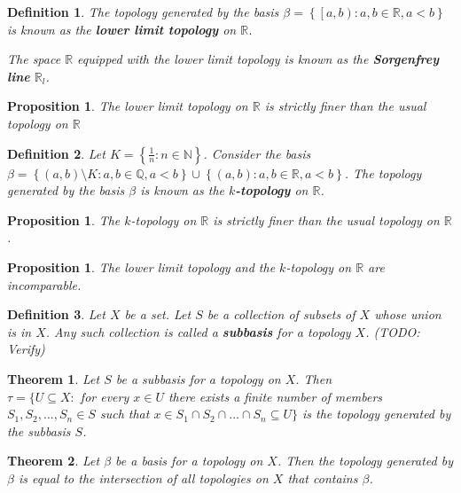 \documentclass[12pt,twoside]{report}
\newtheorem{defn}{Definition}
\newtheorem{thm}{Theorem}
\newtheorem{prop}[subsection]{Proposition}
\begin{document}
\begin{defn}
    The topology generated by the basis $\beta = \left\{ \left [a, b\right )  :  a, b \in \mathbb{R}, a < b \right\}$ is known as the \textbf{lower limit topology} on $\mathbb{R}$. 

    The space $\mathbb{R}$ equipped with the lower limit topology is known as the \textbf{Sorgenfrey line} $\mathbb{R}_l$.
\end{defn}

\begin{prop}
    The lower limit topology on $\mathbb{R}$ is strictly finer than the usual topology on $\mathbb{R}$
\end{prop}

\begin{defn}
    Let $K = \left\{ \frac{1}{n}  :  n \in \mathbb{N} \right\}$. Consider the basis \\ $\beta = \left\{ \left (a, b\right ) \setminus K  :  a,b \in \mathbb{Q}, a < b \right\} \cup \left\{ \left (a,b\right )  :  a,b \in \mathbb{R}, a < b \right\}$.  The topology generated by the basis $\beta$ is known as the \textbf{$k$-topology} on $\mathbb{R}$.
\end{defn}

\begin{prop}
    The $k$-topology on $\mathbb{R}$ is strictly finer than the usual topology on $\mathbb{R}$.
\end{prop}

\begin{prop}
    The lower limit topology and the $k$-topology on $\mathbb{R}$ are incomparable.
\end{prop}


\begin{defn}
    Let $X$ be a set. Let $S$ be a collection of subsets of $X$ whose union is in $X$. Any such collection is called a \textbf{subbasis} for a topology $X$. (TODO: Verify)
\end{defn}

\begin{thm}
    Let $S$ be a subbasis for a topology on $X$. Then
    \\ $\tau = \{ U \subseteq X  :  $ for every $ x \in U $ there exists a finite number of members $ S_1, S_2, ..., S_n \in S $ such that $ x \in S_1 \cap S_2 \cap ... \cap S_n \subseteq U \}$ is the topology generated by the subbasis $S$.
\end{thm}

\begin{thm}
    Let $\beta$ be a basis for a topology on $X$. Then the topology generated by $\beta$ is equal to the intersection of all topologies on $X$ that contains $\beta$.
\end{thm}
\end{document}
